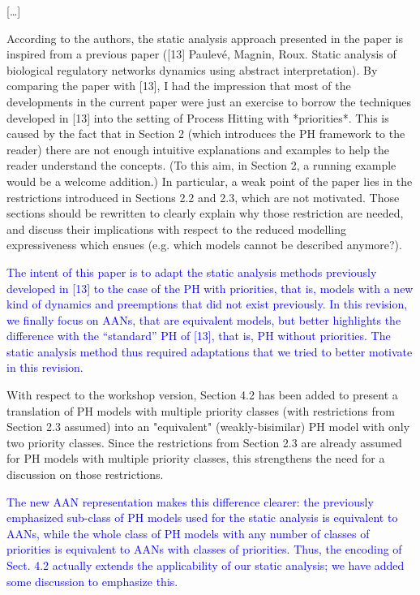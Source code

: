 \documentclass[11pt]{article}
\newcommand{\answer}[1]{\textcolor{blue}{#1}\vspace*{1em}}
\begin{document}
[…]

According to the authors, the static analysis approach presented in the paper is inspired from a previous paper ([13] Paulevé, Magnin, Roux. Static analysis of biological regulatory networks dynamics using abstract interpretation). By comparing the paper with [13], I had the impression that most of the developments in the current paper were just an exercise to borrow the techniques developed in [13] into the setting of Process Hitting with *priorities*. This is caused by the fact that in Section 2 (which introduces the PH framework to the reader) there are not enough intuitive explanations and examples to help the reader understand the concepts. (To this aim, in Section 2, a running example would be a welcome addition.)
In particular, a weak point of the paper lies in the restrictions introduced in Sections 2.2 and 2.3, which are not motivated. Those sections should be rewritten to clearly explain why those restriction are needed, and discuss their implications with respect to the reduced modelling expressiveness which ensues (e.g. which models cannot be described anymore?).

\answer{
The intent of this paper is to adapt the static analysis methods previously developed in [13] to the case of the PH with priorities, that is, models with a new kind of dynamics and preemptions that did not exist previously.
In this revision, we finally focus on AANs, that are equivalent models,
but better highlights the difference with the “standard” PH of [13],
that is, PH without priorities.
The static analysis method thus required adaptations
that we tried to better motivate in this revision.
}

With respect to the workshop version, Section 4.2 has been added to present a translation of PH models with multiple priority classes (with restrictions from Section 2.3 assumed) into an "equivalent" (weakly-bisimilar) PH model with only two priority classes. Since the restrictions from Section 2.3 are already assumed for PH models with multiple priority classes, this strengthens the need for a discussion on those restrictions.

\answer{
The new AAN representation makes this difference clearer:
the previously emphasized sub-class of PH models used for the static analysis
is equivalent to AANs,
while the whole class of PH models with any number of classes of priorities
is equivalent to AANs with classes of priorities.
Thus, the encoding of Sect. 4.2 actually extends the applicability
of our static analysis; we have added some discussion to emphasize this.
}
\end{document}
